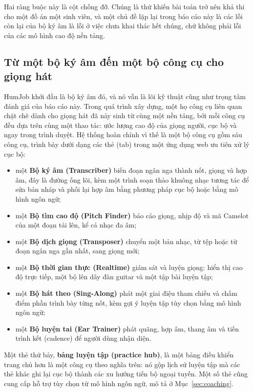 \documentclass[12pt,a4paper]{article}
\begin{document}
Hai ràng buộc này là cột chống đỡ. Chúng là thứ khiến bài toán trở nên khả thi cho
một đồ án một sinh viên, và một chủ đề lặp lại trong báo cáo này là các lỗi còn lại
của bộ ký âm là lỗi ở việc chưa khai thác hết chúng, chứ không phải lỗi của các mô
hình cao độ nền tảng.

\subsection{Từ một bộ ký âm đến một bộ công cụ cho giọng hát}
\label{sec:toolkit-intro}

HumJob khởi đầu là bộ ký âm đó, và nó vẫn là lõi kỹ thuật cũng như trọng tâm đánh
giá của báo cáo này. Trong quá trình xây dựng, một họ công cụ liên quan chặt chẽ
dành cho giọng hát đã nảy sinh từ cùng một nền tảng, bởi mỗi công cụ đều dựa trên
cùng một thao tác: ước lượng cao độ của giọng người, cục bộ và ngay trong trình
duyệt. Hệ thống hoàn chỉnh vì thế là một bộ công cụ gồm sáu công cụ, trình bày dưới
dạng các thẻ (tab) trong một ứng dụng web ưu tiên xử lý cục bộ:

\begin{itemize}
    \item một \textbf{Bộ ký âm (Transcriber)} biến đoạn ngân nga thành nốt, giọng
    và hợp âm, đây là đường ống lõi, kèm một trình soạn thảo khuông nhạc tương tác
    để sửa bản nháp và phối lại hợp âm bằng phương pháp cục bộ hoặc bằng mô hình
    ngôn ngữ;
    \item một \textbf{Bộ tìm cao độ (Pitch Finder)} báo cáo giọng, nhịp độ và mã
    Camelot của một đoạn tải lên, kể cả nhạc đa âm;
    \item một \textbf{Bộ dịch giọng (Transposer)} chuyển một bản nhạc, từ tệp hoặc
    từ đoạn ngân nga gần nhất, sang giọng mới;
    \item một \textbf{Bộ thời gian thực (Realtime)} giám sát và luyện giọng: hiển
    thị cao độ trực tiếp, một bộ lên dây đàn guitar và một tập bài luyện tập;
    \item một \textbf{Bộ hát theo (Sing-Along)} phát một giai điệu tham chiếu và
    chấm điểm phần trình bày từng nốt, kèm gợi ý luyện tập tùy chọn bằng mô hình
    ngôn ngữ;
    \item một \textbf{Bộ luyện tai (Ear Trainer)} phát quãng, hợp âm, thang âm và
    tiến trình kết (cadence) để người dùng nhận diện.
\end{itemize}

Một thẻ thứ bảy, \textbf{bảng luyện tập (practice hub)}, là một bảng điều khiển
trang chủ hơn là một công cụ theo nghĩa trên: nó gộp lịch sử luyện tập mà các thẻ
khác ghi lại cục bộ thành các xu hướng tiến bộ ngoại tuyến. Một số thẻ cũng cung
cấp hỗ trợ tùy chọn từ mô hình ngôn ngữ, mô tả ở Mục~\ref{sec:coaching}.
\end{document}
